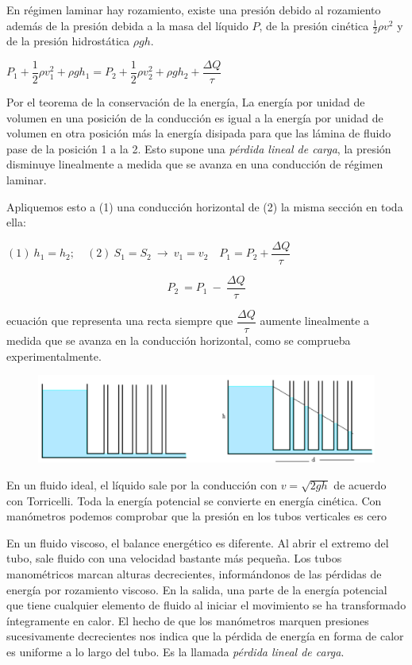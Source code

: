 En régimen laminar hay rozamiento, existe una presión debido al rozamiento además de la presión debida a la masa del líquido $P$, de la presión cinética $\frac 1 2 \rho v^2$ y de la presión hidrostática  $\rho g h$.

$P_1+\dfrac 1 2 \rho v_1^2 + \rho g h_1=P_2+\dfrac 1 2 \rho v_2^2 + \rho g h_2 + \dfrac{\Delta Q}{\tau}$

Por el teorema de la conservación de la energía, La energía por unidad de volumen en una posición de la conducción es igual a la energía por unidad de volumen en otra posición más la energía disipada para que las lámina de fluido pase de la posición 1 a la 2. Esto supone una \emph{pérdida lineal de carga}, la presión disminuye linealmente a medida que se avanza en una conducción de régimen laminar.

Apliquemos esto a (1) una conducción horizontal de (2) la misma sección en toda ella:

$\mathrm{(1)}\ h_1=h_2;\quad  \mathrm{(2)}\ S_1=S_2 \ \to \ v_1=v_2 \quad P_1=P_2+ \dfrac{\Delta Q}{\tau}$

$$P_2 \ = P_1 \ - \ \dfrac{\Delta Q}{\tau}$$

ecuación que representa una recta siempre que $\dfrac{\Delta Q}{\tau}$ aumente linealmente a medida que se avanza en la conducción horizontal, como se comprueba experimentalmente.

\begin{figure}[H]
	\centering
	\includegraphics[width=.75\textwidth]{imagenes/imagenes18/T18IM13.png}
	\end{figure}

En un fluido ideal,  el líquido sale por la conducción con $v=\sqrt{2gh}$ de acuerdo con Torricelli. Toda la energía potencial se convierte en energía cinética. Con manómetros podemos comprobar que la presión en los tubos verticales es cero

En un fluido viscoso, el balance energético es diferente. Al abrir el extremo del tubo, sale fluido con una velocidad bastante más pequeña. Los tubos manométricos marcan alturas decrecientes, informándonos de las pérdidas de energía por rozamiento viscoso. En la salida, una parte de la energía potencial que tiene cualquier elemento de fluido al iniciar el movimiento se ha transformado íntegramente en calor. El hecho de que los manómetros marquen presiones sucesivamente decrecientes nos indica que la pérdida de energía en forma de calor es uniforme a lo largo del tubo. Es la llamada \emph{pérdida lineal de carga}.

